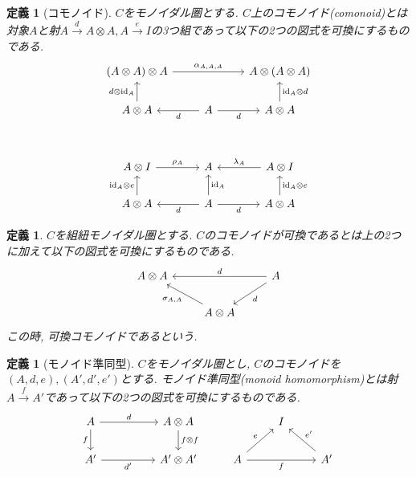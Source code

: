 \documentclass[a4paper,12pt]{ltjsarticle}
\theoremstyle{break}
\newtheorem{defn}[thm]{定義}
\newcommand{\xr}[1]{\xrightarrow{#1}}
\newcommand{\id}{\mathrm{id}}
\newcommand{\al}{\alpha}
\newcommand{\la}{\lambda}
\newcommand{\si}{\sigma}
\newcommand{\ot}{\otimes}
\numberwithin{equation}{section}
\begin{document}
\begin{defn}[コモノイド]
  $C$をモノイダル圏とする. 
  $C$上のコモノイド(comonoid)とは対象$A$と射$A \xr{d} A \ot A, A \xr{e} I$の3つ組であって以下の2つの図式を可換にするものである. 
  \[\begin{tikzcd}
    {(A \ot A) \ot A} && {A \ot (A \ot A)} \\
    {A \ot A} & A & {A \ot A} \\
    \\
    {A \ot I} & A & {A \ot I} \\
    {A \ot A} & A & {A \ot A}
    \arrow["{\id_A \ot d}"', from=2-3, to=1-3]
    \arrow["{\al_{A,A,A}}", from=1-1, to=1-3]
    \arrow["{d \ot \id_A}", from=2-1, to=1-1]
    \arrow["d"', from=2-2, to=2-3]
    \arrow["d", from=2-2, to=2-1]
    \arrow["{\id_A}"', from=5-2, to=4-2]
    \arrow["{\la_A}"', from=4-3, to=4-2]
    \arrow["{\id_A \ot e}"', from=5-3, to=4-3]
    \arrow["d"', from=5-2, to=5-3]
    \arrow["{\rho_A}", from=4-1, to=4-2]
    \arrow["{\id_A \ot e}", from=5-1, to=4-1]
    \arrow["d", from=5-2, to=5-1]
  \end{tikzcd}\]
\end{defn}

\begin{defn}
  $C$を組紐モノイダル圏とする. 
  $C$のコモノイドが可換であるとは上の2つに加えて以下の図式を可換にするものである.
  \[\begin{tikzcd}
    {A \ot A} && A \\
    & {A \ot A}
    \arrow["d"', from=1-3, to=1-1]
    \arrow["{\si_{A,A}}", from=2-2, to=1-1]
    \arrow["d", from=1-3, to=2-2]
  \end{tikzcd}\]
  この時, 可換コモノイドであるという. 
\end{defn}

\begin{defn}[モノイド準同型]
  $C$をモノイダル圏とし, $C$のコモノイドを$(A,d,e), (A',d',e')$とする. 
  モノイド準同型(monoid homomorphism)とは射$A \xr{f} A'$であって以下の2つの図式を可換にするものである. 
  \[\begin{tikzcd}
    A && {A \ot A} && I \\
    {A'} && {A' \ot A'} & A && {A'}
    \arrow["d", from=1-1, to=1-3]
    \arrow["{f \ot f}", from=1-3, to=2-3]
    \arrow["f"', from=1-1, to=2-1]
    \arrow["{d'}"', from=2-1, to=2-3]
    \arrow["e", from=2-4, to=1-5]
    \arrow["f"', from=2-4, to=2-6]
    \arrow["{e'}"', from=2-6, to=1-5]
  \end{tikzcd}\]
\end{defn}
\end{document}
